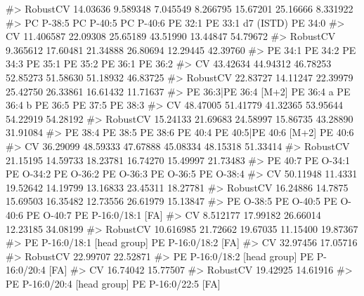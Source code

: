 \documentclass[
  letterpaper,
  DIV=11,
  numbers=noendperiod]{scrreprt}
\newenvironment{Shaded}{\begin{snugshade}}{\end{snugshade}}
\newcommand{\CommentTok}[1]{\textcolor[rgb]{0.37,0.37,0.37}{#1}}
\begin{document}
\begin{Shaded}
\begin{Highlighting}[]
\CommentTok{\#\textgreater{} RobustCV  14.03636  9.589348  7.045549  8.266795  15.67201  25.16666  8.331922}
\CommentTok{\#\textgreater{}          PC P{-}38:5 PC P{-}40:5 PC P{-}40:6  PE 32:1 PE 33:1 d7 (ISTD)  PE 34:0}
\CommentTok{\#\textgreater{} CV       11.406587  22.09308  25.65189 43.51990          13.44847 54.79672}
\CommentTok{\#\textgreater{} RobustCV  9.365612  17.60481  21.34888 26.80694          12.29445 42.39760}
\CommentTok{\#\textgreater{}           PE 34:1  PE 34:2  PE 34:3  PE 35:1  PE 35:2  PE 36:1  PE 36:2}
\CommentTok{\#\textgreater{} CV       43.42634 44.94312 46.78253 52.85273 51.58630 51.18932 46.83725}
\CommentTok{\#\textgreater{} RobustCV 22.83727 14.11247 22.39979 25.42750 26.33861 16.61432 11.71637}
\CommentTok{\#\textgreater{}          PE 36:3|PE 36:4 [M+2] PE 36:4 a PE 36:4 b  PE 36:5  PE 37:5  PE 38:3}
\CommentTok{\#\textgreater{} CV                    48.47005  51.41779  41.32365 53.95644 54.22919 54.28192}
\CommentTok{\#\textgreater{} RobustCV              15.24133  21.69683  24.58997 15.86735 43.28890 31.91084}
\CommentTok{\#\textgreater{}           PE 38:4  PE 38:5  PE 38:6  PE 40:4 PE 40:5|PE 40:6 [M+2]  PE 40:6}
\CommentTok{\#\textgreater{} CV       36.29099 48.59333 47.67888 45.08334              48.15318 51.33414}
\CommentTok{\#\textgreater{} RobustCV 21.15195 14.59733 18.23781 16.74270              15.49997 21.73483}
\CommentTok{\#\textgreater{}           PE 40:7 PE O{-}34:1 PE O{-}34:2 PE O{-}36:2 PE O{-}36:3 PE O{-}36:5 PE O{-}38:4}
\CommentTok{\#\textgreater{} CV       50.11948   11.4331  19.52642  14.19799  13.16833  23.45311  18.27781}
\CommentTok{\#\textgreater{} RobustCV 16.24886   14.7875  15.69503  16.35482  12.73556  26.61979  15.13847}
\CommentTok{\#\textgreater{}          PE O{-}38:5 PE O{-}40:5 PE O{-}40:6 PE O{-}40:7 PE P{-}16:0/18:1 [FA]}
\CommentTok{\#\textgreater{} CV        8.512177  17.99182  26.66014  12.23185            34.08199}
\CommentTok{\#\textgreater{} RobustCV 10.616985  21.72662  19.67035  11.15400            19.87367}
\CommentTok{\#\textgreater{}          PE P{-}16:0/18:1 [head group] PE P{-}16:0/18:2 [FA]}
\CommentTok{\#\textgreater{} CV                          32.97456            17.05716}
\CommentTok{\#\textgreater{} RobustCV                    22.99707            22.52871}
\CommentTok{\#\textgreater{}          PE P{-}16:0/18:2 [head group] PE P{-}16:0/20:4 [FA]}
\CommentTok{\#\textgreater{} CV                          16.74042            15.77507}
\CommentTok{\#\textgreater{} RobustCV                    19.42925            14.61916}
\CommentTok{\#\textgreater{}          PE P{-}16:0/20:4 [head group] PE P{-}16:0/22:5 [FA]}

\end{Highlighting}
\end{Shaded}
\end{document}
